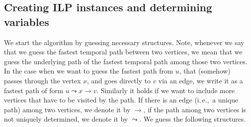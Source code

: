\documentclass[11pt,a4paper]{article}
\theoremstyle{remark}
\theoremstyle{definition}
\newcommand{\ie}{i.\,e.,\ }
\begin{document}
\subsection{Creating ILP instances and determining variables}
We start the algorithm by guessing necessary structures.
Note, whenever we say that we guess the fastest temporal path between two vertices, we mean that we guess the underlying path of the fastest temporal path among those two vertices.
In the case when we want to guess the fastest path from $u$, that (somehow) passes through the vertex $x$, and goes directly to $v$ via an edge, we write it as a fastest path of form $u \leadsto x \rightarrow v$.
Similarly it holds if we want to include more vertices that have to be visited by the path. If there is an edge (\ie a unique path) among two vertices, we denote it by $\rightarrow$,
if the path among two vertices is not uniquely determined, we denote it by $\leadsto$.
We guess the following structures.
\end{document}
